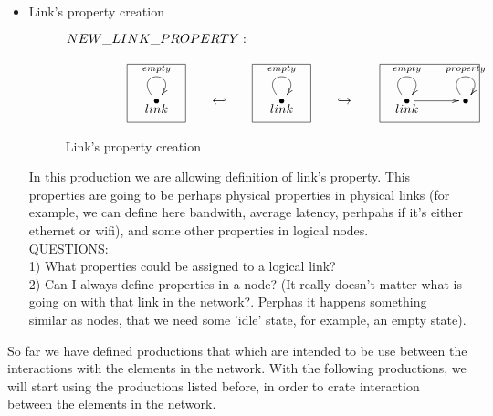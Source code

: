 \documentclass[envcountsect,runningheads]{llncs}
\begin{document}
\begin{itemize}
  \item Link's property creation
  \begin{figure}[H]
    \[
       \xymatrix@C=35pt@R=16pt
       {
         {}\POS[]+<0pc,2pc>\drop{NEW\_LINK\_PROPERTY:}
         \\
         {\bullet}\ar@(ul,ur)^{empty} \POS[]-<0pc,.5pc>\drop{link}
         \POS[]+<0pc,.5pc> *+=<3.8pc,3.8pc>[F-]{} 
         & {\hookleftarrow} &
         {\bullet}\ar@(ul,ur)^{empty}\POS[]-<0pc,.5pc>\drop{link}
         \POS[]+<0pc,.5pc> *+=<3.8pc,3.8pc>[F-]{} & {\hookrightarrow} &
         {\bullet}\ar@(ul,ur)^{empty} \ar@{->}[r]\POS[]-<0pc,.5pc>\drop{link}
         \POS[]+<1.5pc,.5pc> *+=<6.5pc,3.8pc>[F-]{} &
         {\bullet}\ar@(ul,ur)^{property}
         \POS[]+<0pc,.5pc>*+=<4pc,4pc>[]{}\drop{}
       }
    \]
    \caption{Link's property creation}
    \protect\label{fig:linkpropertycreation}
  \end{figure}
  In this production we are allowing definition of link's property. This properties are going to be 
  perhaps physical properties in physical links (for example, we can define here bandwith, 
  average latency, perhpahs if it's either ethernet or wifi), and some other properties in logical 
  nodes.\\
  QUESTIONS:\\
  1) What properties could be assigned to a logical link? \\
  2) Can I always define properties in a node? (It really doesn't matter what is going on with 
  that link in the network?. Perphas it happens something similar as nodes, that we need some 
  'idle' state, for example, an empty state).\\
  
  \end{itemize}
  
  So far we have defined productions that which are intended to be use between the interactions 
  with the elements in the network. With the following productions, we will start using the productions
  listed before, in order to crate interaction between the elements in the network. \\
  
\end{document}
